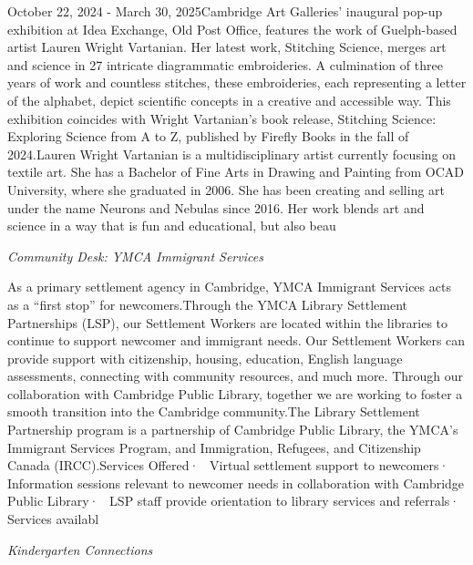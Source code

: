 \documentclass[letterpaper, 10pt]{article}
\newcommand{\subtitle}[1]{\textit{\large #1}\vspace{0.5em}}
\newcommand{\articlecontent}[1]{\small #1\vspace{1em}}
\begin{document}
\begin{multicols}{2}
{October 22, 2024 - March 30, 2025Cambridge Art Galleries' inaugural pop-up exhibition at Idea Exchange, Old Post Office, features the work of Guelph-based artist Lauren Wright Vartanian. Her latest work, Stitching Science, merges art and science in 27 intricate diagrammatic embroideries. A culmination of three years of work and countless stitches, these embroideries, each representing a letter of the alphabet, depict scientific concepts in a creative and accessible way. This exhibition coincides with Wright Vartanian’s book release, Stitching Science: Exploring Science from A to Z, published by Firefly Books in the fall of 2024.Lauren Wright Vartanian is a multidisciplinary artist currently focusing on textile art. She has a Bachelor of Fine Arts in Drawing and Painting from OCAD University, where she graduated in 2006. She has been creating and selling art under the name Neurons and Nebulas since 2016. Her work blends art and science in a way that is fun and educational, but also beau
}
\vspace{10px}

\subtitle{Community Desk: YMCA Immigrant Services}

\articlecontent{

\qrcode[height=1.5cm]{https://ideaexchange.libnet.info/event/12494380}
\vspace{10px}

As a primary settlement agency in Cambridge, YMCA Immigrant Services acts as a “first stop” for newcomers.Through the YMCA Library Settlement Partnerships (LSP), our Settlement Workers are located within the libraries to continue to support newcomer and immigrant needs. Our Settlement Workers can provide support with citizenship, housing, education, English language assessments, connecting with community resources, and much more. Through our collaboration with Cambridge Public Library, together we are working to foster a smooth transition into the Cambridge community.The Library Settlement Partnership program is a partnership of Cambridge Public Library, the YMCA’s Immigrant Services Program, and Immigration, Refugees, and Citizenship Canada (IRCC).Services Offered·  Virtual settlement support to newcomers·  Information sessions relevant to newcomer needs in collaboration with Cambridge Public Library·  LSP staff provide orientation to library services and referrals·  Services availabl
}
\vspace{10px}

\subtitle{Kindergarten Connections}

\articlecontent{

}
\end{multicols}
\end{document}
